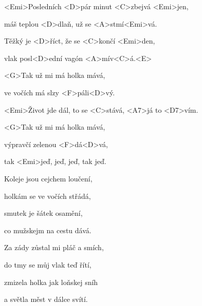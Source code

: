 

\zs
<Emi>Posledních <D>pár minut <C>zbejvá <Emi>jen,

máš teplou <D>dlaň, už se <A>stmí<Emi>vá.

Těžký je <D>říct, že se <C>končí <Emi>den,

vlak posl<D>ední vagón <A>mív<C>á.<E>
\ks

\zr
<G>Tak už mi má holka mává,

ve vočích má slzy <F>páli<D>vý.

<Emi>Život jde dál, to se <C>stává, <A7>já to <D7>vím.

<G>Tak už mi má holka mává,

výpravčí zelenou <F>dá<D>vá,

tak <Emi>jeď, jeď, jeď, tak jeď.
\kr

\zs
Koleje jsou cejchem loučení,

holkám se ve vočích střádá,

smutek je šátek osamění,

co mužskejm na cestu dává.
\ks

\zr \kr

\zs
Za zády zůstal mi pláč a smích,

do tmy se můj vlak teď řítí,

zmizela holka jak loňskej sníh

a světla měst v dálce svítí.
\ks

\zr \kr

\kp





